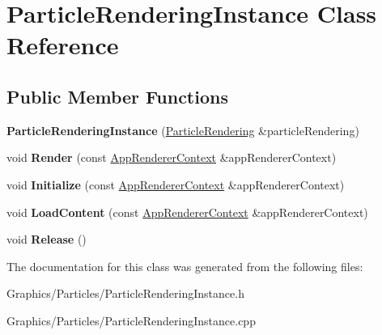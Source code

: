 \hypertarget{classParticleRenderingInstance}{}\section{Particle\+Rendering\+Instance Class Reference}
\label{classParticleRenderingInstance}
\subsection*{Public Member Functions}
\begin{DoxyCompactItemize}
\item 
\mbox{\label{classParticleRenderingInstance_a2bc1d161a2352d5cb73a0b10d44c13a2}} 
{\bfseries Particle\+Rendering\+Instance} (\hyperlink{classParticleRendering}{Particle\+Rendering} \&particle\+Rendering)
\item 
\mbox{\label{classParticleRenderingInstance_a18c27921ee0496f740e285d9aec1eecf}} 
void {\bfseries Render} (const \hyperlink{structAppRendererContext}{App\+Renderer\+Context} \&app\+Renderer\+Context)
\item 
\mbox{\label{classParticleRenderingInstance_a1fe166326ba936a5a8693583b6589d16}} 
void {\bfseries Initialize} (const \hyperlink{structAppRendererContext}{App\+Renderer\+Context} \&app\+Renderer\+Context)
\item 
\mbox{\label{classParticleRenderingInstance_a17c8e685fa7b590668ba377fbcb3b009}} 
void {\bfseries Load\+Content} (const \hyperlink{structAppRendererContext}{App\+Renderer\+Context} \&app\+Renderer\+Context)
\item 
\mbox{\label{classParticleRenderingInstance_a5923abbdbe2a0b35c82d0feb31291583}} 
void {\bfseries Release} ()
\end{DoxyCompactItemize}


The documentation for this class was generated from the following files\+:\begin{DoxyCompactItemize}
\item 
Graphics/\+Particles/Particle\+Rendering\+Instance.\+h\item 
Graphics/\+Particles/Particle\+Rendering\+Instance.\+cpp\end{DoxyCompactItemize}
